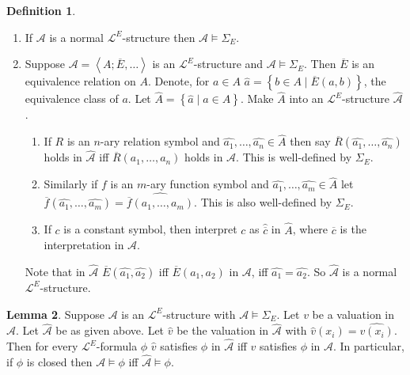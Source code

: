 \documentclass{article}
\newcommand{\A}{\mathcal{A}}
\renewcommand{\L}{\mathcal{L}}
\newcommand{\rb}[1]{\left( #1 \right)}
\newcommand{\cb}[1]{\left\{ #1 \right\}}
\newcommand{\ab}[1]{\left\langle #1 \right\rangle}
\theoremstyle{definition}\newtheorem{definition}{Definition}[subsection]
\theoremstyle{definition}\newtheorem{remark}[definition]{Remark}
\theoremstyle{definition}\newtheorem*{example}{Example}
\theoremstyle{definition}\newtheorem*{note}{Note}
\newtheorem{lemma}[definition]{Lemma}
\begin{document}
\begin{definition}
\hfill
\begin{enumerate}
\item If $ \A $ is a normal $ \L^E $-structure then $ \A \vDash \Sigma_E $.
\item Suppose $ \A = \ab{A; \overline{E}, \dots} $ is an $ \L^E $-structure and $ \A \vDash \Sigma_E $. Then $ \overline{E} $ is an equivalence relation on $ A $. Denote, for $ a \in A $ $ \widehat{a} = \cb{b \in A \mid \overline{E}\rb{a, b}} $, the equivalence class of $ a $. Let $ \widehat{A} = \cb{\widehat{a} \mid a \in A} $. Make $ \widehat{A} $ into an $ \L^E $-structure $ \widehat{\A} $.
\begin{enumerate}
\item If $ R $ is an $ n $-ary relation symbol and $ \widehat{a_1}, \dots, \widehat{a_n} \in \widehat{A} $ then say $ \overline{R}\rb{\widehat{a_1}, \dots, \widehat{a_n}} $ holds in $ \widehat{\A} $ iff $ \overline{R}\rb{a_1, \dots, a_n} $ holds in $ \A $. This is well-defined by $ \Sigma_E $.
\item Similarly if $ f $ is an $ m $-ary function symbol and $ \widehat{a_1}, \dots, \widehat{a_m} \in \widehat{A} $ let $ \overline{f}\rb{\widehat{a_1}, \dots, \widehat{a_m}} = \widehat{\overline{f}\rb{a_1, \dots, a_m}} $. This is also well-defined by $ \Sigma_E $.
\item If $ c $ is a constant symbol, then interpret $ c $ as $ \widehat{\overline{c}} $ in $ \widehat{A} $, where $ \overline{c} $ is the interpretation in $ \A $.
\end{enumerate}
Note that in $ \widehat{\A} $ $ \overline{E}\rb{\widehat{a_1}, \widehat{a_2}} $ iff $ \overline{E}\rb{a_1, a_2} $ in $ \A $, iff $ \widehat{a_1} = \widehat{a_2} $. So $ \widehat{\A} $ is a normal $ \L^E $-structure.
\end{enumerate}
\end{definition}

\begin{lemma}
\label{lem:2.6.3}
Suppose $ \A $ is an $ \L^E $-structure with $ \A \vDash \Sigma_E $. Let $ v $ be a valuation in $ \A $. Let $ \widehat{\A} $ be as given above. Let $ \widehat{v} $ be the valuation in $ \widehat{\A} $ with $ \widehat{v}\rb{x_i} = \widehat{v\rb{x_i}} $. Then for every $ \L^E $-formula $ \phi $ $ \widehat{v} $ satisfies $ \phi $ in $ \widehat{\A} $ iff $ v $ satisfies $ \phi $ in $ \A $. In particular, if $ \phi $ is closed then $ \A \vDash \phi $ iff $ \widehat{\A} \vDash \phi $.
\end{lemma}
\end{document}
